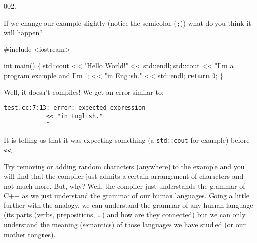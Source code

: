 \documentclass[]{article}
\newenvironment{Shaded}{}{}
\newcommand{\BuiltInTok}[1]{#1}
\newcommand{\ControlFlowTok}[1]{\textcolor[rgb]{0.00,0.44,0.13}{\textbf{#1}}}
\newcommand{\DataTypeTok}[1]{\textcolor[rgb]{0.56,0.13,0.00}{#1}}
\newcommand{\DecValTok}[1]{\textcolor[rgb]{0.25,0.63,0.44}{#1}}
\newcommand{\ImportTok}[1]{#1}
\newcommand{\NormalTok}[1]{#1}
\newcommand{\PreprocessorTok}[1]{\textcolor[rgb]{0.74,0.48,0.00}{#1}}
\newcommand{\StringTok}[1]{\textcolor[rgb]{0.25,0.44,0.63}{#1}}
\begin{document}
\noindent
{\tiny 002.}\\
\begin{minipage}[t]{.485\linewidth}

If we change our example slightly (notice the semicolon (\texttt{;}))
what do you think it will happen?

\begin{framed}

\begin{Shaded}
\begin{Highlighting}[]
\PreprocessorTok{#include }\ImportTok{<iostream>}

\DataTypeTok{int}\NormalTok{ main()}
\NormalTok{\{}
  \BuiltInTok{std::}\NormalTok{cout << }\StringTok{"Hello World!"}\NormalTok{ << }\BuiltInTok{std::}\NormalTok{endl;}
  \BuiltInTok{std::}\NormalTok{cout << }\StringTok{"I'm a program example and I'm "}\NormalTok{;}
\NormalTok{            << }\StringTok{"in English."}
\NormalTok{            << }\BuiltInTok{std::}\NormalTok{endl;}
  \ControlFlowTok{return} \DecValTok{0}\NormalTok{;}
\NormalTok{\}}
\end{Highlighting}
\end{Shaded}

\end{framed}

\end{minipage}
\hfill
\begin{minipage}[t]{.485\linewidth}

Well, it doesn't compiles! We get an error similar to:

\begin{framed}

\begin{verbatim}
test.cc:7:13: error: expected expression
            << "in English."
            ^
\end{verbatim}

\end{framed}

It is telling us that it was expecting something (a \texttt{std::cout}
for example) before \texttt{\textless{}\textless{}}.

Try removing or adding random characters (anywhere) to the example and
you will find that the compiler just admits a certain arrangement of
characters and not much more. But, why? Well, the compiler just
understands the grammar of C++ as we just understand the grammar of our
human languages. Going a little further with the analogy, we can
understand the grammar of any human language (its parts (verbs,
prepositions, \ldots{}) and how are they connected) but we can only
understand the meaning (semantics) of those languages we have studied
(or our mother tongues).

\end{minipage}
\end{document}
